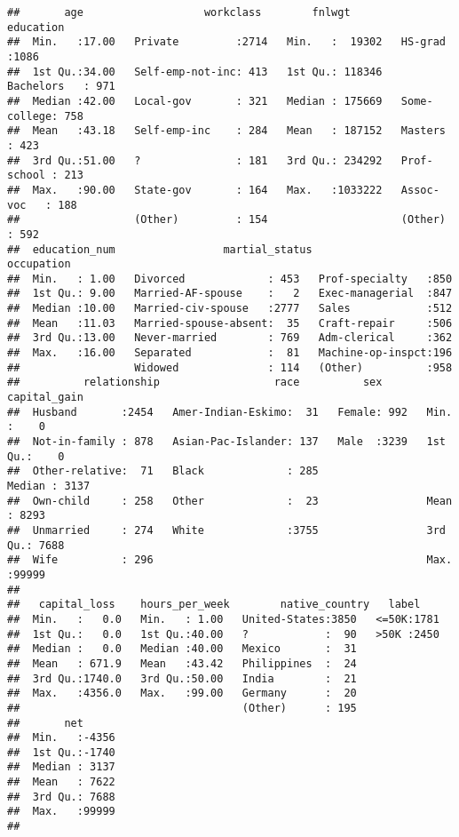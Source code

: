 \documentclass[]{article}
\begin{document}
\begin{verbatim}
##       age                   workclass        fnlwgt               education   
##  Min.   :17.00   Private         :2714   Min.   :  19302   HS-grad     :1086  
##  1st Qu.:34.00   Self-emp-not-inc: 413   1st Qu.: 118346   Bachelors   : 971  
##  Median :42.00   Local-gov       : 321   Median : 175669   Some-college: 758  
##  Mean   :43.18   Self-emp-inc    : 284   Mean   : 187152   Masters     : 423  
##  3rd Qu.:51.00   ?               : 181   3rd Qu.: 234292   Prof-school : 213  
##  Max.   :90.00   State-gov       : 164   Max.   :1033222   Assoc-voc   : 188  
##                  (Other)         : 154                     (Other)     : 592  
##  education_num                 martial_status             occupation 
##  Min.   : 1.00   Divorced             : 453   Prof-specialty   :850  
##  1st Qu.: 9.00   Married-AF-spouse    :   2   Exec-managerial  :847  
##  Median :10.00   Married-civ-spouse   :2777   Sales            :512  
##  Mean   :11.03   Married-spouse-absent:  35   Craft-repair     :506  
##  3rd Qu.:13.00   Never-married        : 769   Adm-clerical     :362  
##  Max.   :16.00   Separated            :  81   Machine-op-inspct:196  
##                  Widowed              : 114   (Other)          :958  
##          relationship                  race          sex        capital_gain  
##  Husband       :2454   Amer-Indian-Eskimo:  31   Female: 992   Min.   :    0  
##  Not-in-family : 878   Asian-Pac-Islander: 137   Male  :3239   1st Qu.:    0  
##  Other-relative:  71   Black             : 285                 Median : 3137  
##  Own-child     : 258   Other             :  23                 Mean   : 8293  
##  Unmarried     : 274   White             :3755                 3rd Qu.: 7688  
##  Wife          : 296                                           Max.   :99999  
##                                                                               
##   capital_loss    hours_per_week        native_country   label     
##  Min.   :   0.0   Min.   : 1.00   United-States:3850   <=50K:1781  
##  1st Qu.:   0.0   1st Qu.:40.00   ?            :  90   >50K :2450  
##  Median :   0.0   Median :40.00   Mexico       :  31               
##  Mean   : 671.9   Mean   :43.42   Philippines  :  24               
##  3rd Qu.:1740.0   3rd Qu.:50.00   India        :  21               
##  Max.   :4356.0   Max.   :99.00   Germany      :  20               
##                                   (Other)      : 195               
##       net       
##  Min.   :-4356  
##  1st Qu.:-1740  
##  Median : 3137  
##  Mean   : 7622  
##  3rd Qu.: 7688  
##  Max.   :99999  
## 
\end{verbatim}
\end{document}
